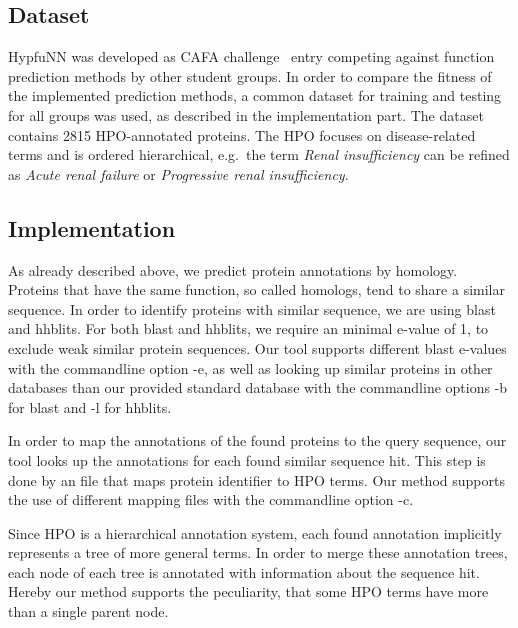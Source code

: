 \subsection{Dataset}

HypfuNN was developed as CAFA challenge~\citep{CAFA} entry competing against function prediction methods by other student groups. In order to compare the fitness of the implemented prediction methods, a common
dataset for training and testing for all groups was used, as described in the implementation part. The dataset contains 2815 HPO-annotated proteins. The HPO focuses on disease-related terms and is ordered hierarchical, e.g.~the term \textit{Renal insufficiency} can be refined as \textit{Acute renal failure} or \textit{Progressive renal insufficiency}.


\subsection{Implementation}

As already described above, we predict protein annotations by homology. Proteins that have the same function, so called homologs, tend to share a similar sequence. In order to identify proteins
with similar sequence, we are using blast and hhblits. For both blast and hhblits, we require an minimal e-value of 1, to exclude weak similar protein sequences. Our tool supports different blast e-values with the commandline option -e, as well as looking up similar proteins in other databases than our provided standard database with the commandline options -b for blast and -l for hhblits.

In order to map the annotations of the found proteins to the query sequence, our tool looks up the annotations for each found similar sequence hit. This step is done by an file that maps protein identifier to HPO terms. Our method supports the use of different mapping files with the commandline option -c.

Since HPO is a hierarchical annotation system, each found annotation implicitly represents a tree of more general terms. In order to merge these annotation trees, each node of each tree is annotated with information about the sequence hit. Hereby our method supports the peculiarity, that some HPO terms have more than a single parent node.


